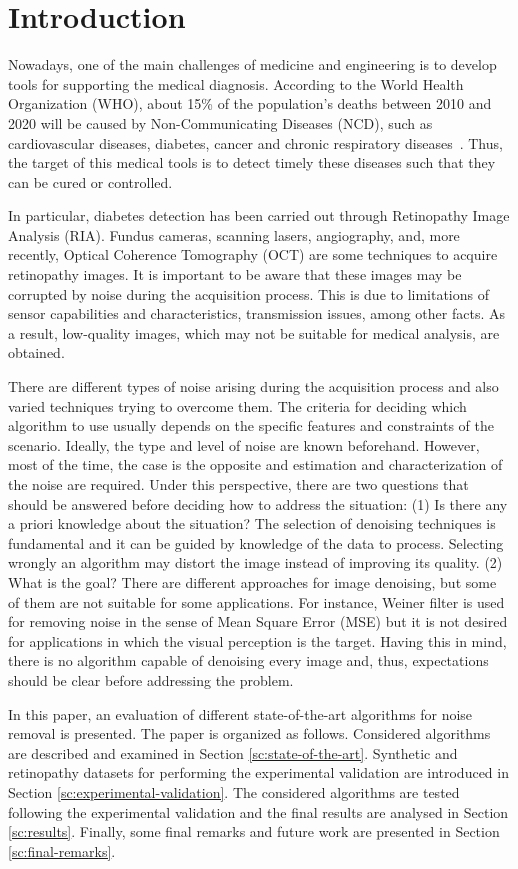 \section{Introduction}

Nowadays, one of the main challenges of medicine and engineering is to develop tools for supporting the medical diagnosis. According to the World Health Organization (WHO), about 15\% of the population's deaths between 2010 and 2020 will be caused by Non-Communicating Diseases (NCD), such as cardiovascular diseases, diabetes, cancer and chronic respiratory diseases~\cite{who}. Thus, the target of this medical tools is to detect timely these diseases such that they can be cured or controlled.

In particular, diabetes detection has been carried out through Retinopathy Image Analysis (RIA). Fundus cameras, scanning lasers, angiography, and, more recently, Optical Coherence Tomography (OCT) are some techniques to acquire retinopathy images. It is important to be aware that these images may be corrupted by noise during the acquisition process. This is due to limitations of sensor capabilities and characteristics, transmission issues, among other facts. As a result, low-quality images, which may not be suitable for medical analysis, are obtained. 

There are different types of noise arising during the acquisition process and also varied techniques trying to overcome them. The criteria for deciding which algorithm to use usually depends on the specific features and constraints of the scenario. Ideally, the type and level of noise are known beforehand. However, most of the time, the case is the opposite and estimation and characterization of the noise are required. Under this perspective, there are two questions that should be answered before deciding how to address the situation:
(1) Is there any a priori knowledge about the situation? The selection of denoising techniques is fundamental and it can be guided by knowledge of the data to process. Selecting wrongly an algorithm may distort the image instead of improving its quality. (2) What is the goal? There are different approaches for image denoising, but some of them are not suitable for some applications. For instance, Weiner filter is used for removing noise in the sense of Mean Square Error (MSE) but it is not desired for applications in which the visual perception is the target. Having this in mind, there is no algorithm capable of denoising every image and, thus,  expectations should be clear before addressing the problem.

In this paper, an evaluation of different state-of-the-art algorithms for noise removal is presented. The paper is organized as follows. Considered algorithms are described and examined in Section \ref{sc:state-of-the-art}. Synthetic and retinopathy datasets for performing the experimental validation are introduced in Section \ref{sc:experimental-validation}. The considered algorithms are tested following the experimental validation and the final results are analysed in Section \ref{sc:results}. Finally, some final remarks and future work are presented in Section \ref{sc:final-remarks}. 